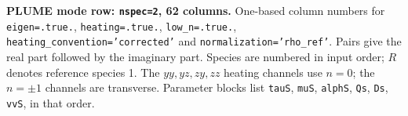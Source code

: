 \documentclass[border=6pt]{standalone}
\begin{document}
\begin{minipage}{20cm}
\medskip
\raggedright
\textbf{PLUME mode row: \texttt{nspec=2}, 62 columns.}
One-based column numbers for \texttt{eigen=.true.},
\texttt{heating=.true.}, \texttt{low\_n=.true.},
\texttt{heating\_convention='corrected'} and \texttt{normalization='rho\_ref'}.
Pairs give the real part followed by the imaginary part.
Species are numbered in input order; $R$ denotes reference species 1.
The $yy,yz,zy,zz$ heating channels use $n=0$; the $n=\pm1$ channels are transverse.
Parameter blocks list \texttt{tauS}, \texttt{muS}, \texttt{alphS},
\texttt{Qs}, \texttt{Ds}, \texttt{vvS}, in that order.
\end{minipage}
\end{document}
